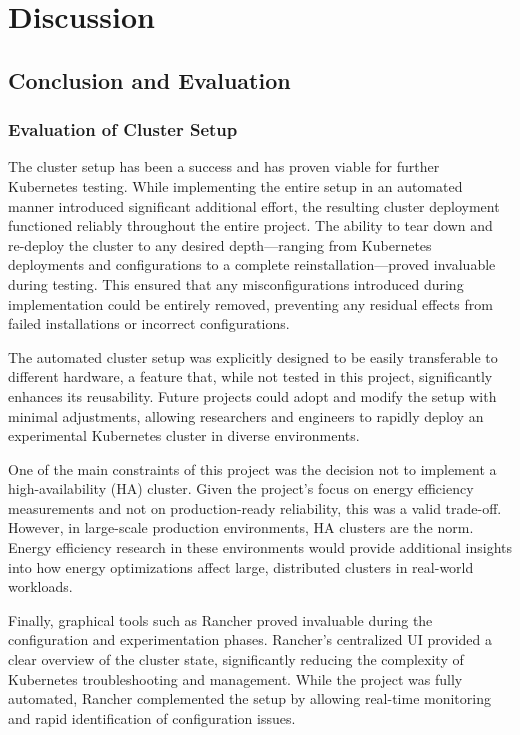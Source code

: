 
\chapter{Discussion} %
\label{Chapter6}

\section{Conclusion and Evaluation}

\subsection{Evaluation of Cluster Setup}

The cluster setup has been a success and has proven viable for further Kubernetes testing. While implementing the entire setup in an automated manner introduced significant additional effort, the resulting cluster deployment functioned reliably throughout the entire project. The ability to tear down and re-deploy the cluster to any desired depth—ranging from Kubernetes deployments and configurations to a complete reinstallation—proved invaluable during testing. This ensured that any misconfigurations introduced during implementation could be entirely removed, preventing any residual effects from failed installations or incorrect configurations.

The automated cluster setup was explicitly designed to be easily transferable to different hardware, a feature that, while not tested in this project, significantly enhances its reusability. Future projects could adopt and modify the setup with minimal adjustments, allowing researchers and engineers to rapidly deploy an experimental Kubernetes cluster in diverse environments.

One of the main constraints of this project was the decision not to implement a high-availability (HA) cluster. Given the project's focus on energy efficiency measurements and not on production-ready reliability, this was a valid trade-off. However, in large-scale production environments, HA clusters are the norm. Energy efficiency research in these environments would provide additional insights into how energy optimizations affect large, distributed clusters in real-world workloads. 

Finally, graphical tools such as Rancher proved invaluable during the configuration and experimentation phases. Rancher's centralized UI provided a clear overview of the cluster state, significantly reducing the complexity of Kubernetes troubleshooting and management. While the project was fully automated, Rancher complemented the setup by allowing real-time monitoring and rapid identification of configuration issues.

